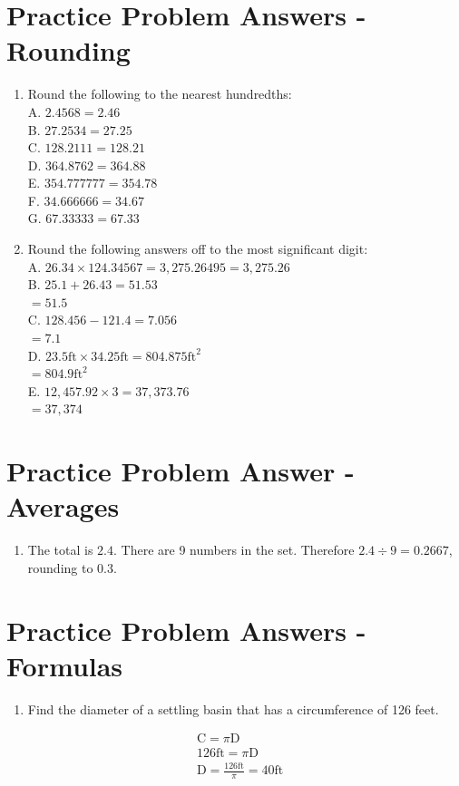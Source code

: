 \documentclass[10pt]{article}
\begin{document}
\section{Practice Problem Answers - Rounding}
\begin{enumerate}
  \item Round the following to the nearest hundredths:\\
A. $2.4568=2.46$\\
B. $27.2534=27.25$\\
C. $128.2111=128.21$\\
D. $364.8762=364.88$\\
E. $354.777777=354.78$\\
F. $34.666666=34.67$\\
G. $67.33333=67.33$

  \item Round the following answers off to the most significant digit:\\
A. $26.34 \times 124.34567=3,275.26495=3,275.26$\\
B. $25.1+26.43=51.53$\\
$=51.5$\\
C. $128.456-121.4=7.056$\\
$=7.1$\\
D. $23.5 \mathrm{ft} \times 34.25 \mathrm{ft}=804.875 \mathrm{ft}^{2}$\\
$=804.9 \mathrm{ft}^{2}$\\
E. $12,457.92 \times 3=37,373.76$\\
$=37,374$

\end{enumerate}
\section{Practice Problem Answer - Averages}
\begin{enumerate}
  \item The total is $2.4$. There are 9 numbers in the set. Therefore $2.4 \div 9=0.2667$, rounding to $0.3$.
\end{enumerate}
\section{Practice Problem Answers - Formulas}
\begin{enumerate}
  \item Find the diameter of a settling basin that has a circumference of 126 feet.
\end{enumerate}
$$
\begin{aligned}
&\mathrm{C}=\pi \mathrm{D} \\
&126 \mathrm{ft}=\pi \mathrm{D} \\
&\mathrm{D}=\frac{126 \mathrm{ft}}{\pi}=40 \mathrm{ft}
\end{aligned}
$$
\end{document}
